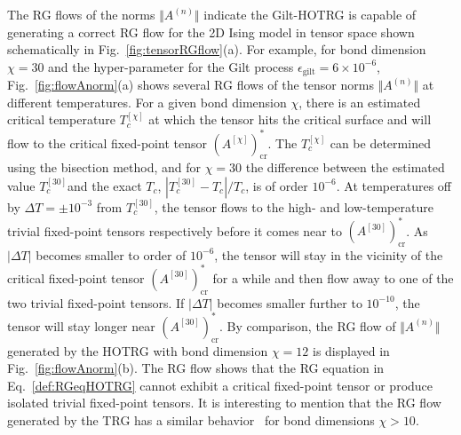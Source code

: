 \documentclass[aps,prb,reprint,superscriptaddress,floatfix]{revtex4-2}
\begin{document}
The RG flows of the norms $\Vert A^{(n)} \Vert$ indicate the Gilt-HOTRG is
capable of generating a correct RG flow for the 2D Ising model in tensor
space shown schematically in Fig.~\ref{fig:tensorRGflow}(a). For example,
for bond dimension $\chi = 30$ and the hyper-parameter for the Gilt process
$\epsilon_{\text{gilt}} = 6\times 10^{-6}$, Fig.~\ref{fig:flowAnorm}(a)
shows several RG flows of the tensor norms $\Vert A^{(n)} \Vert$ at
different temperatures. For a given bond dimension $\chi$, there is an
estimated critical
temperature $T_c^{[\chi]}$ at which the tensor
hits the critical surface and will flow to the critical fixed-point
tensor $(A^{[\chi]})^*_{\text{cr}}$. The $T_c^{[\chi]}$ can be determined
using the bisection method, and for $\chi = 30$ the difference between
the estimated value $T_c^{[30]}$and the exact $T_c$, $|T_c^{[30]} - T_c|
/ T_c$, is of order $10^{-6}$. At temperatures off by $\Delta T = \pm 10^{-3}$
from $T_c^{[30]}$, the tensor flows to the high- and
low-temperature trivial fixed-point tensors respectively before it comes
near to $(A^{[30]})^*_{\text{cr}}$. As $|\Delta T|$ becomes smaller to
order of $10^{-6}$, the tensor will stay in the vicinity of the critical
fixed-point tensor $(A^{[30]})^*_{\text{cr}}$ for a while and then flow
away to one of the two trivial fixed-point tensors. If $|\Delta T|$
becomes smaller further to $10^{-10}$, the tensor
will stay longer near $(A^{[30]})^*_{\text{cr}}$. By comparison, the
RG flow of $\Vert A^{(n)}\Vert$ generated by the HOTRG with bond
dimension $\chi = 12$ is displayed in Fig.~\ref{fig:flowAnorm}(b). The RG
flow shows that the RG equation in Eq.~\eqref{def:RGeqHOTRG} cannot
exhibit a
critical fixed-point tensor or produce isolated trivial fixed-point
tensors. It is interesting to mention that the RG flow generated by the
TRG has a similar behavior~\cite{Berker2008} for bond
dimensions $\chi > 10$.
\end{document}
